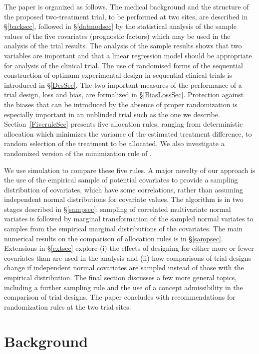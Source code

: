 \documentclass[number,12pt,review]{elsarticle}
\begin{document}
The paper is organized as follows. The medical background and the structure of the proposed two-treatment trial, to be performed at two sites,  are described in \S\ref{backsec}, followed in \S\ref{datmodsec} by the statistical analysis of the sample values of  the five covariates (prognostic factors) which may be used in the analysis of the trial results. The analysis of the sample results shows that two variables are important and that a linear regression model should be appropriate for analysis of the clinical trial. The use of randomised forms of the sequential construction of optimum experimental design in sequential clinical trials is introduced in \S\ref{DesSec}. The two important measures of the performance of a trial design, loss and bias, are formalized in \S\ref{BiasLossSec}. Protection against the biases that can be introduced by the absence of proper randomization is especially important in an unblinded trial such as the one we describe. Section~\ref{FiveruleSec} presents five allocation rules, ranging from deterministic allocation which minimizes the variance of the estimated treatment difference, to random selection of the treatment to be allocated. We also investigate a randomized version of the minimization rule of \citet{p+s:75}.

We use simulation to compare these five rules. A major novelty of our approach is the use of the empirical sample of potential covariates to provide a sampling distribution of covariates, which have some correlations, rather than assuming independent normal distributions for covariate values. The algorithm is in two stages described in \S\ref{sampsec}: sampling of correlated multivariate normal variates is followed by marginal transformation of the sampled normal variates  to samples from the empirical marginal distributions of the covariates. The main numerical results on the comparison of allocation rules is in \S\ref{sampsec}. Extensions in \S\ref{extsec} explore (i) the effects of designing for either more or fewer covariates than are used in the analysis and (ii) how comparisons of trial designs change if  independent normal covariates are sampled instead of those with the empirical distribution. The final section discusses a few more general topics, including a further sampling rule and the use of a concept admissibility in the comparison of trial designs. The paper concludes with recommendations for randomization rules at the two trial sites.

\section{Background}
\end{document}
